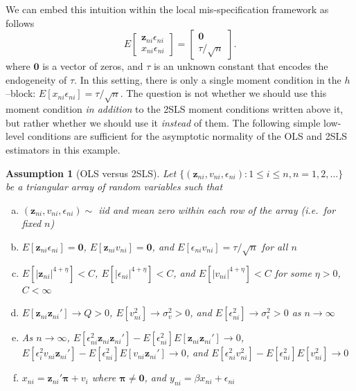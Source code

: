 \documentclass[12pt]{article}
\newtheorem{assump}{Assumption}[section]
\theoremstyle{definition}
\begin{document}
We can embed this intuition within the local mis-specification framework as follows
  \begin{equation}
     E \left[\begin{array}{c} \mathbf{z}_{ni} \epsilon_{ni} \\ x_{ni} \epsilon_{ni} \end{array}\right] = \left[\begin{array}{c} \mathbf{0} \\ \tau/\sqrt{n} \end{array}\right].
  \end{equation}
where $\mathbf{0}$ is a vector of zeros, and $\tau$ is an unknown constant that encodes the endogeneity of $\tau$. 
In this setting, there is only a single moment condition in the $h$--block: $E[x_{ni}\epsilon_{ni}] = \tau/\sqrt{n}$. 
The question is not whether we should use this moment condition \emph{in addition} to the 2SLS moment conditions written above it, but rather whether we should use it \emph{instead} of them.
The following simple low-level conditions are sufficient for the asymptotic normality of the OLS and 2SLS estimators in this example.

\begin{assump}[OLS versus 2SLS]\label{assump:OLSvsIV}
	Let $\{(\mathbf{z}_{ni}, v_{ni}, \epsilon_{ni})\colon 1\leq i \leq n, n = 1, 2, \hdots\}$ be a triangular array of random variables such that
	\begin{enumerate}[(a)]
		\item $(\mathbf{z}_{ni}, v_{ni}, \epsilon_{ni}) \sim$ iid and mean zero within each row of the array (i.e.\ for fixed $n$)
		\item $E[\mathbf{z}_{ni} \epsilon_{ni}]=\mathbf{0}$, $E[\mathbf{z}_{ni} v_{ni}]=\mathbf{0}$, and $E[\epsilon_{ni}v_{ni}] = \tau/\sqrt{n}$ for all $n$
		\item $E[\left|\mathbf{z}_{ni}\right|^{4+\eta}] <C$, $E[\left|\epsilon_{ni}\right|^{4+\eta}] <C$, and $E[\left|v_{ni}\right|^{4+\eta}] <C$ for some $\eta >0$, $C <\infty$
		\item $E[\mathbf{z}_{ni} \mathbf{z}_{ni}'] \rightarrow Q>0$, $E[v_{ni}^2]\rightarrow \sigma_v^2 >0$, and $E[\epsilon_{ni}^2] \rightarrow \sigma_\epsilon^2 >0$ as $n\rightarrow \infty$
		\item As $n\rightarrow \infty$, $E[\epsilon_{ni}^2 \mathbf{z}_{ni} \mathbf{z}_{ni}']- E[\epsilon_{ni}^2]E[ \mathbf{z}_{ni} \mathbf{z}_{ni}'] \rightarrow 0$, $E[\epsilon_i^2 v_{ni} \mathbf{z}_{ni}'] - E[\epsilon_{ni}^2]E[v_{ni} \mathbf{z}_{ni}'] \rightarrow 0$, and $E[\epsilon_{ni}^2 v_{ni}^2] - E[\epsilon_{ni}^2]E[v_{ni}^2] \rightarrow 0$
		\item $x_{ni} = \mathbf{z}_{ni}'\boldsymbol{\pi} + v_i$ where $\boldsymbol{\pi} \neq \mathbf{0}$, and $y_{ni} = \beta x_{ni} + \epsilon_{ni}$
	\end{enumerate}
\end{assump}
\end{document}
